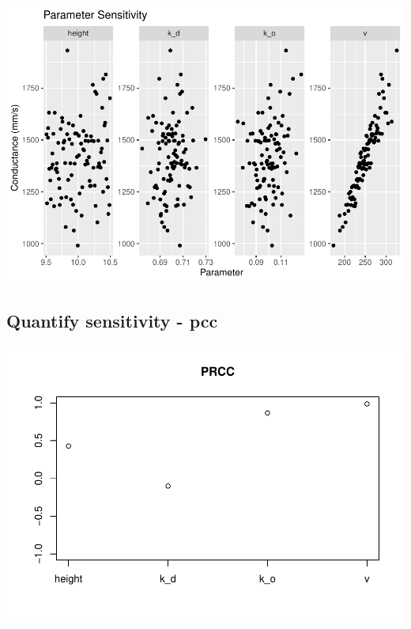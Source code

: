 \documentclass[
]{article}
\newenvironment{Shaded}{\begin{snugshade}}{\end{snugshade}}
\newcommand{\AttributeTok}[1]{\textcolor[rgb]{0.77,0.63,0.00}{#1}}
\newcommand{\CommentTok}[1]{\textcolor[rgb]{0.56,0.35,0.01}{\textit{#1}}}
\newcommand{\ConstantTok}[1]{\textcolor[rgb]{0.00,0.00,0.00}{#1}}
\newcommand{\FunctionTok}[1]{\textcolor[rgb]{0.00,0.00,0.00}{#1}}
\newcommand{\NormalTok}[1]{#1}
\newcommand{\OtherTok}[1]{\textcolor[rgb]{0.56,0.35,0.01}{#1}}
\newcommand{\SpecialCharTok}[1]{\textcolor[rgb]{0.00,0.00,0.00}{#1}}
\begin{document}
\includegraphics{assignment_4_files/figure-latex/unnamed-chunk-4-3.pdf}

\hypertarget{quantify-sensitivity---pcc}{%
\subsection{Quantify sensitivity -
pcc}\label{quantify-sensitivity---pcc}}

\begin{Shaded}
\end{Shaded}

\includegraphics{assignment_4_files/figure-latex/unnamed-chunk-5-1.pdf}
\end{document}
